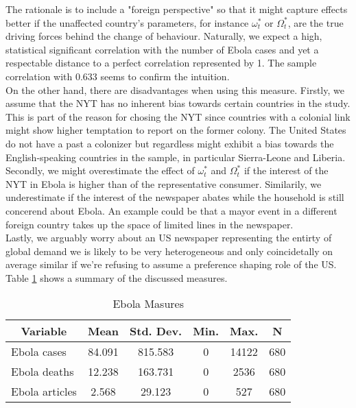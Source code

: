 \documentclass{article}
\begin{document}
The rationale is to include a "foreign perspective" so that it might capture effects better if the unaffected country's parameters, for instance $\omega_t^*$ or $\Omega_t^*$, are the true driving forces behind the change of behaviour. Naturally, we expect a high, statistical significant correlation with the number of Ebola cases and yet a respectable distance to a perfect correlation represented by 1. The sample correlation with 0.633 seems to confirm the intuition. \\
On the other hand, there are disadvantages when using this measure.
Firstly, we assume that the NYT has no inherent bias towards certain countries in the study. This is part of the reason for chosing the NYT since countries with a colonial link might show higher temptation to report on the former colony. The United States do not have a past a colonizer but regardless might exhibit a bias towards the English-speaking countries in the sample, in particular Sierra-Leone and Liberia. \\
Secondly, we might overestimate the effect of $\omega_t^*$ and $\Omega_t^*$ if the interest of the NYT in Ebola is higher than of the representative consumer. Similarily, we underestimate if the interest of the newspaper abates while the household is still concerend about Ebola. An example could be that a mayor event in a different foreign country takes up the space of limited lines in the newspaper.\\
Lastly, we arguably worry about an US newspaper representing the entirty of global demand we is likely to be very heterogeneous and only coincidetally on average similar if we're refusing to assume a preference shaping role of the US. \\
Table \ref{Ebola Measures} shows a summary of the discussed measures.

\begin{table}[htbp]\centering \caption{Ebola Masures \label{Ebola Measures}}
\begin{tabular}{l c c c c c}\hline\hline
\multicolumn{1}{c}{\textbf{Variable}} & \textbf{Mean}
 & \textbf{Std. Dev.}& \textbf{Min.} &  \textbf{Max.} & \textbf{N}\\ \hline
Ebola cases & 84.091 & 815.583 & 0 & 14122 & 680 \\
Ebola deaths & 12.238 & 163.731 & 0 & 2536 & 680 \\
Ebola articles & 2.568 & 29.123 & 0 & 527 & 680 \\
\hline\end{tabular}
\end{table}
\end{document}
